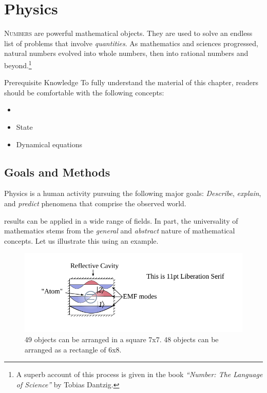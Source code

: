 \graphicspath{{../02Physics/pics/}}
	
\chapter[Physics]{Physics}\label{ch:Physics}

\lettrine[lines=2]{\color{darkocre}N}{umbers} are powerful
mathematical objects. They are used to solve
an endless list of problems that involve \emph{quantities}. As
mathematics
and sciences progressed, natural numbers evolved into whole
numbers, then into rational numbers and beyond.\footnote{A superb account of
this process is given in the book \emph{``Number: The Language of
Science''} by Tobias Dantzig.}

\begin{myprereq}{Prerequisite Knowledge}
	To fully understand the material of this chapter, readers should be comfortable with the following concepts:
	
	\begin{itemize}
		\item \phantom{phantom}
		\vspace{-0.5cm}
		\item State
		\item Dynamical equations
	\end{itemize}	
\end{myprereq}

\section{Goals and Methods}
Physics is a human activity pursuing the following major goals: \emph{Describe}, \emph{explain}, and \emph{predict} phenomena that comprise the observed world.

results can be applied in a wide range of fields. In part, the universality of mathematics
stems from the \emph{general} and \emph{abstract} nature of mathematical
concepts. Let us illustrate this using an example.

\begin{figure}%
  \includegraphics[scale=1.0]{defaultFigureTemplate}
  \caption{49 objects can be arranged in a square 7x7. 48 objects can
    be arranged as a rectangle of 6x8.}
  \label{fig:numbersExampleGenerality}
\end{figure}

